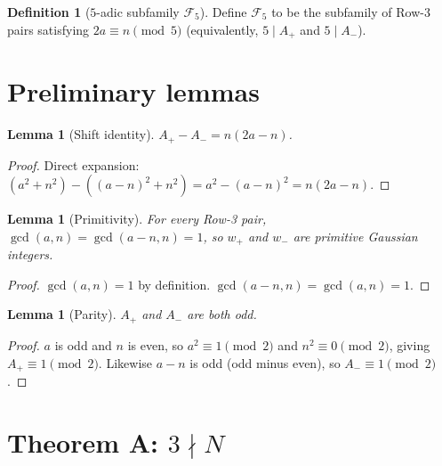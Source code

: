\documentclass[12pt]{amsart}
\theoremstyle{plain}
\newtheorem{lemma}[theorem]{Lemma}
\theoremstyle{definition}
\newtheorem{definition}[theorem]{Definition}
\theoremstyle{remark}
\newcommand{\Aplus}{A_{+}}
\newcommand{\Aminus}{A_{-}}
\begin{document}
\begin{definition}[$5$-adic subfamily $\mathcal{F}_5$]
\label{def:F5}%
Define $\mathcal{F}_5$ to be the subfamily of Row-3 pairs satisfying
$2a\equiv n\pmod{5}$ (equivalently, $5\mid\Aplus$ and $5\mid\Aminus$).
\end{definition}

\section{Preliminary lemmas}
\label{sec:lemmas}

\begin{lemma}[Shift identity]
\label{lem:shift}
$\Aplus - \Aminus = n(2a-n)$.
\end{lemma}

\begin{proof}
Direct expansion: $(a^2+n^2)-((a-n)^2+n^2) = a^2-(a-n)^2 = n(2a-n)$.
\end{proof}

\begin{lemma}[Primitivity]
\label{lem:primitive}
For every Row-3 pair, $\gcd(a,n)=\gcd(a-n,n)=1$, so $w_{+}$ and $w_{-}$
are primitive Gaussian integers.
\end{lemma}

\begin{proof}
$\gcd(a,n)=1$ by definition.  $\gcd(a-n,n)=\gcd(a,n)=1$.
\end{proof}

\begin{lemma}[Parity]
\label{lem:parity}
$\Aplus$ and $\Aminus$ are both odd.
\end{lemma}

\begin{proof}
$a$ is odd and $n$ is even, so $a^2\equiv 1\pmod{2}$ and $n^2\equiv 0\pmod{2}$,
giving $\Aplus\equiv 1\pmod{2}$.  Likewise $a-n$ is odd (odd minus even),
so $\Aminus\equiv 1\pmod{2}$.
\end{proof}

\section{Theorem A: $3\nmid N$}
\label{sec:thm3}
\end{document}

